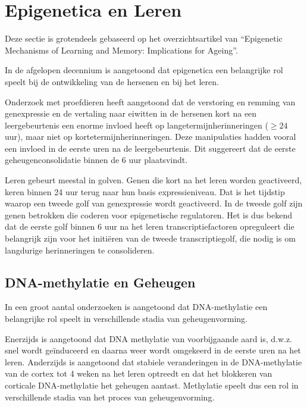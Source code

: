 \documentclass[
  11pt,
]{book}
\begin{document}
\hypertarget{epigenetica-en-leren}{%
\section{Epigenetica en Leren}\label{epigenetica-en-leren}}

Deze sectie is grotendeels gebaseerd op het overzichtsartikel van \citet{Creighton2020} ``Epigenetic Mechanisms of Learning and Memory: Implications for Ageing''.

In de afgelopen decennium is aangetoond dat epigenetica een belangrijke rol speelt bij de ontwikkeling van de hersenen en bij het leren.

Onderzoek met proefdieren heeft aangetoond dat de verstoring en remming van genexpressie en de vertaling naar eiwitten in de hersenen kort na een leergebeurtenis een enorme invloed heeft op langetermijnherinneringen (\(\geq24\) uur), maar niet op kortetermijnherinneringen. Deze manipulaties hadden vooral een invloed in de eerste uren na de leergebeurtenis. Dit suggereert dat de eerste geheugenconsolidatie binnen de 6 uur plaatsvindt.

Leren gebeurt meestal in golven. Genen die kort na het leren worden geactiveerd, keren binnen 24 uur terug naar hun basis expressieniveau. Dat is het tijdstip waarop een tweede golf van genexpressie wordt geactiveerd.
In de tweede golf zijn genen betrokken die coderen voor epigenetische regulatoren.
Het is dus bekend dat de eerste golf binnen 6 uur na het leren transcriptiefactoren opreguleert die belangrijk zijn voor het initiëren van de tweede transcriptiegolf, die nodig is om langdurige herinneringen te consolideren.

\hypertarget{dna-methylatie-en-geheugen}{%
\subsection{DNA-methylatie en Geheugen}\label{dna-methylatie-en-geheugen}}

In een groot aantal onderzoeken is aangetoond dat DNA-methylatie een belangrijke rol speelt in verschillende stadia van geheugenvorming.

Enerzijds is aangetoond dat DNA methylatie van voorbijgaande aard is, d.w.z. snel wordt geïnduceerd en daarna weer wordt omgekeerd in de eerste uren na het leren. Anderzijds is aangetoond dat stabiele veranderingen in de DNA-methylatie van de cortex tot 4 weken na het leren optreedt en dat het blokkeren van corticale DNA-methylatie het geheugen aantast.
Methylatie speelt dus een rol in verschillende stadia van het proces van geheugenvorming.
\end{document}
